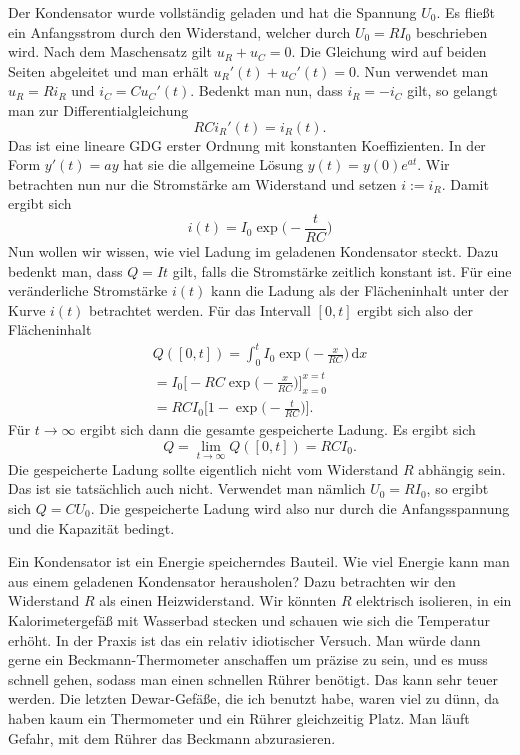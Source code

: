 \documentclass[a4paper,10pt,fleqn,twocolumn,twoside]{article}
\numberwithin{equation}{section}
\begin{document}
\noindent
Der Kondensator wurde vollständig geladen und hat die Spannung
$U_0$. Es fließt ein Anfangsstrom durch den Widerstand, welcher
durch $U_0=RI_0$ beschrieben wird. Nach dem Maschensatz
gilt $u_R+u_C=0$.
Die Gleichung wird auf beiden Seiten abgeleitet und man erhält
$u_R'(t)+u_C'(t)=0$. Nun verwendet man $u_R=Ri_R$ und $i_C=Cu_C'(t)$.
Bedenkt man nun, dass $i_R=-i_C$ gilt, so gelangt man zur
Differentialgleichung
\begin{equation}
RCi_R'(t) = i_R(t).
\end{equation}
Das ist eine lineare GDG erster Ordnung mit konstanten Koeffizienten.
In der Form $y'(t)=ay$ hat sie die allgemeine Lösung
$y(t)=y(0)e^{at}$. Wir betrachten nun nur die Stromstärke am
Widerstand und setzen $i:=i_R$. Damit ergibt sich
\begin{equation}\label{RCStrom}
i(t) = I_0\exp\Big(-\frac{t}{RC}\Big)
\end{equation}
Nun wollen wir wissen, wie viel Ladung im geladenen Kondensator
steckt. Dazu bedenkt man, dass $Q=It$ gilt, falls die Stromstärke
zeitlich konstant ist. Für eine veränderliche Stromstärke $i(t)$
kann die Ladung als der Flächeninhalt unter der Kurve $i(t)$
betrachtet werden. Für das Intervall $[0,t]$ ergibt sich also
der Flächeninhalt
\begin{gather*}
Q([0,t]) = \int_0^t I_0 \exp\Big(-\frac{x}{RC}\Big)\,\mathrm dx\\
= I_0\Big[-RC\exp\Big(-\frac{x}{RC}\Big)\Big]_{x=0}^{x=t}\\
= RC I_0 \Big[1-\exp\Big(-\frac{t}{RC}\Big)\Big].
\end{gather*}
Für $t\rightarrow\infty$ ergibt sich dann die gesamte gespeicherte
Ladung. Es ergibt sich
\begin{equation}
Q = \lim_{t\rightarrow\infty}Q([0,t]) = RCI_0.
\end{equation}
Die gespeicherte Ladung sollte eigentlich nicht vom Widerstand
$R$ abhängig sein. Das ist sie tatsächlich auch nicht. Verwendet
man nämlich $U_0=RI_0$, so ergibt sich $Q=CU_0$. Die gespeicherte
Ladung wird also nur durch die Anfangsspannung und die Kapazität
bedingt.

Ein Kondensator ist ein Energie speicherndes Bauteil. Wie viel
Energie kann man aus einem geladenen Kondensator herausholen?
Dazu betrachten wir den Widerstand $R$ als einen Heizwiderstand.
Wir könnten $R$ elektrisch isolieren, in ein Kalorimetergefäß
mit Wasserbad stecken und schauen wie sich die Temperatur erhöht.
In der Praxis ist das ein relativ idiotischer Versuch. Man würde
dann gerne ein Beckmann-Thermometer anschaffen um präzise zu sein,
und es muss schnell gehen, sodass man einen schnellen Rührer
benötigt. Das kann sehr teuer werden. Die letzten Dewar-Gefäße,
die ich benutzt habe, waren viel zu dünn, da haben kaum ein
Thermometer und ein Rührer gleichzeitig Platz. Man läuft Gefahr,
mit dem Rührer das Beckmann abzurasieren. 
\end{document}
